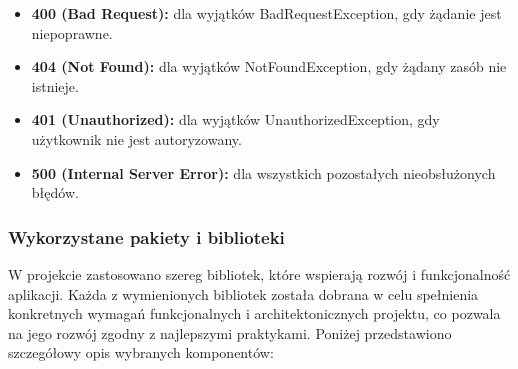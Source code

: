\documentclass[12pt,a4paper]{article}
\begin{document}
\begin{itemize}
    \item \textbf{400 (Bad Request):} dla wyjątków BadRequestException, gdy żądanie jest niepoprawne.
    \item \textbf{404 (Not Found):} dla wyjątków NotFoundException, gdy żądany zasób nie istnieje.
    \item \textbf{401 (Unauthorized):} dla wyjątków UnauthorizedException, gdy użytkownik nie jest autoryzowany.
    \item \textbf{500 (Internal Server Error):} dla wszystkich pozostałych nieobsłużonych błędów.
\end{itemize}

\newpage

\subsubsection{Wykorzystane pakiety i biblioteki}

\noindent
W projekcie zastosowano szereg bibliotek, które wspierają rozwój i funkcjonalność aplikacji. Każda z wymienionych bibliotek została dobrana w celu spełnienia konkretnych wymagań funkcjonalnych i architektonicznych projektu, co pozwala na jego rozwój zgodny z najlepszymi praktykami. Poniżej przedstawiono szczegółowy opis wybranych komponentów:
\end{document}

